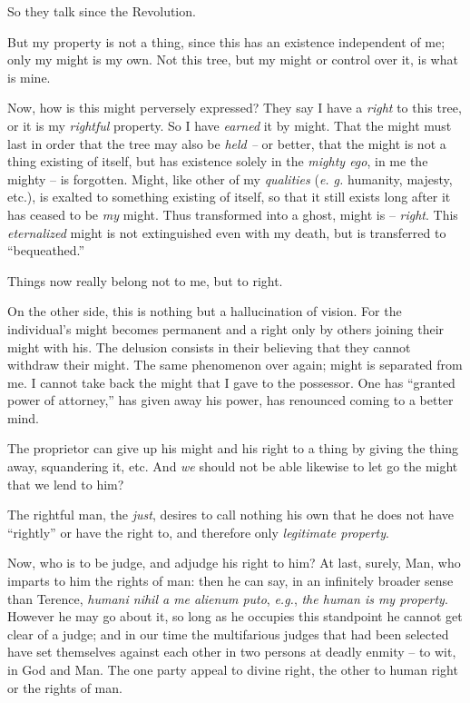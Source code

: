 So they talk since the Revolution.

But my property is not a thing, since this has an existence independent of me; 
only my might is my own. Not this tree, but my might or control over it, is 
what is mine.

Now, how is this might perversely expressed? They say I have a \textit{right} 
to this tree, or it is my \textit{rightful} property. So I have 
\textit{earned} it by might. That the might must last in order that the tree 
may also be \textit{held --} or better, that the might is not a thing existing 
of itself, but has existence solely in the \textit{mighty ego}, in me the 
mighty -- is forgotten. Might, like other of my \textit{qualities} (\textit{e. 
g.} humanity, majesty, etc.), is exalted to something existing of itself, so 
that it still exists long after it has ceased to be \textit{my} might. Thus 
transformed into a ghost, might is -- \textit{right}. This 
\textit{eternalized} might is not extinguished even with my death, but is 
transferred to ``bequeathed.''

Things now really belong not to me, but to right.

On the other side, this is nothing but a hallucination of vision. For the 
individual's might becomes permanent and a right only by others joining their 
might with his. The delusion consists in their believing that they cannot 
withdraw their might. The same phenomenon over again; might is separated from 
me. I cannot take back the might that I gave to the possessor. One has 
``granted power of attorney,'' has given away his power, has renounced 
coming to a better mind.

The proprietor can give up his might and his right to a thing by giving the 
thing away, squandering it, etc. And \textit{we} should not be able likewise 
to let go the might that we lend to him?

The rightful man, the \textit{just}, desires to call nothing his own that he 
does not have ``rightly'' or have the right to, and therefore only 
\textit{legitimate property}.

Now, who is to be judge, and adjudge his right to him? At last, surely, Man, 
who imparts to him the rights of man: then he can say, in an infinitely 
broader sense than Terence, \textit{humani nihil a me alienum puto}, 
\textit{e.g.}, \textit{the human is my property}. However he may go about it, 
so long as he occupies this standpoint he cannot get clear of a judge; and in 
our time the multifarious judges that had been selected have set themselves 
against each other in two persons at deadly enmity -- to wit, in God and Man. 
The one party appeal to divine right, the other to human right or the rights 
of man.

